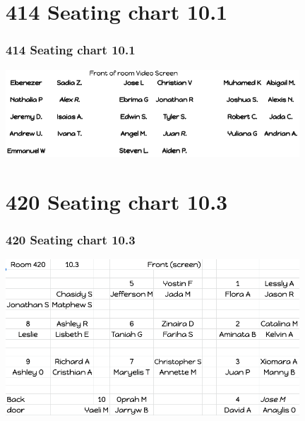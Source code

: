 \documentclass{beamer}
\begin{document}
  \section{414 Seating chart 10.1}
  \frame
  {
    \frametitle{414 Seating chart 10.1}
    \includegraphics[width=11cm]{Seating_10A-414.png}
  }

  \section{420 Seating chart 10.3}
  \frame
  {
    \frametitle{420 Seating chart 10.3}
    \begin{center}
      \includegraphics[width=11cm]{10C_seating.png}
    \end{center}
  }
\end{document}
